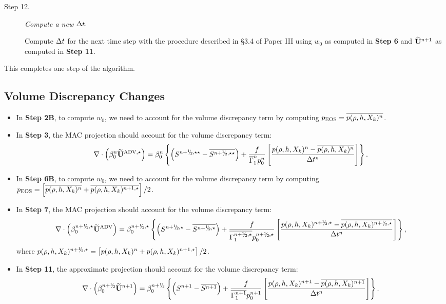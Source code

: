 \begin{description}
\item[Step 12.] {\em Compute a new $\Delta t.$}

Compute $\Delta t$ for the next time step with the procedure described in
\S 3.4 of Paper III using $w_0$ as computed in {\bf Step 6} and $\widetilde{{\bf U}}^{n+1}$
as computed in {\bf Step 11}.

\end{description}

\noindent This completes one step of the algorithm.



\subsection{Volume Discrepancy Changes}
\begin{itemize}
\item In {\bf Step 2B}, to compute $w_0$, we need to account for the volume discrepancy
term by computing $p_{\rm EOS} = \overline{p(\rho,h,X_k)^n}$.
\item In {\bf Step 3}, the MAC projection should account for the volume discrepancy term:
\begin{equation}
\nabla \cdot \left(\beta_0^n \uadvone\right) = 
\beta_0^n \left\{ \left(S^{\nph,\star\star} - \overline{S^{\nph,\star\star}}\right)
+ \frac{f}{\gammabar^n p_0^n}
\left[\frac{p(\rho,h,X_k)^n - \overline{p(\rho,h,X_k)^n}}{\Delta t^n}\right]\right\}.
\end{equation}
\item In {\bf Step 6B}, to compute $w_0$, we need to account for the volume discrepancy
term by computing $p_{\rm EOS} = \left[\overline{p(\rho,h,X_k)^n} + \overline{p(\rho,h,X_k)^{n+1,\star}}\right]/2$.
\item In {\bf Step 7}, the MAC projection should account for the volume discrepancy term:
\begin{equation}
\nabla \cdot \left(\beta_0^{\nph,\star} \uadvtwo\right) = \beta_0^{\nph,\star}\left\{\left(S^{\nph,\star} - \overline{S^{\nph,\star}}\right) + \frac{f}{\overline{\Gamma_1^{\nph,\star}} p_0^{\nph,\star}} \left[\frac{p(\rho,h,X_k)^{\nph,\star} - \overline{p(\rho,h,X_k)^{\nph,\star}}}{\Delta t^n}\right]\right\},
\end{equation}
where $p(\rho,h,X_k)^{\nph,\star} = \left[p(\rho,h,X_k)^n +p(\rho,h,X_k)^{n+1,\star}\right]/2$.
\item In {\bf Step 11}, the approximate projection should account for the volume
discrepancy term:
\begin{equation}
\nabla \cdot \left(\beta_0^{\nph} \Ubt^{n+1} \right)  = \beta_0^{\nph}\left\{  \left(S^{n+1} - \overline{S^{n+1}} \right)
+ \frac{f}{\overline{\Gamma_1^{n+1}} p_0^{n+1}}
\left[\frac{p(\rho,h,X_k)^{n+1} - \overline{p(\rho,h,X_k)^{n+1}}}{\Delta t^n}\right]\right\}.
\end{equation}
\end{itemize}
